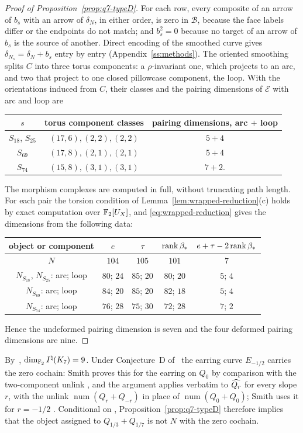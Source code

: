 \begin{proof}[Proof of Proposition~\ref{prop:q7-typeD}]
For each row, every composite of an arrow of $b_s$ with an arrow of $\delta_N$, in either order, is zero
in $\mathcal B$, because the face labels differ or the endpoints do not match; and $b_s^2=0$ because no
target of an arrow of $b_s$ is the source of another.  Direct encoding of the smoothed curve gives
$\delta_{N_s}=\delta_N+b_s$ entry by entry (Appendix~\ref{ss:methods}).
The oriented smoothing splits $C$ into three torus components: a $\rho$-invariant one, which projects to
an arc, and two that project to one closed pillowcase component, the loop.  With the orientations
induced from $C$, their classes and the pairing dimensions of $\mathcal E$ with arc and loop are
\begin{center}
\begin{tabular}{c|c|c}
$s$ & torus component classes & pairing dimensions, arc $+$ loop \\ \hline
$S_{18}$, $S_{25}$ & $(17,6),(2,2),(2,2)$ & $5+4$ \\
$S_{69}$ & $(17,8),(2,1),(2,1)$ & $5+4$ \\
$S_{74}$ & $(15,8),(3,1),(3,1)$ & $7+2$.
\end{tabular}
\end{center}
The morphism complexes are computed in full, without truncating path length.  For each pair the torsion
condition of Lemma~\ref{lem:wrapped-reduction}(c) holds by exact computation over $\mathbb{F}_2[U_X]$, and
\eqref{eq:wrapped-reduction} gives the dimensions from the following data:
\begin{center}
\small
\begin{tabular}{c|c|c|c|c}
object or component & $e$ & $\tau$ & $\operatorname{rank}\beta_*$ & $e+\tau-2\operatorname{rank}\beta_*$ \\ \hline
$N$ & $104$ & $105$ & $101$ & $7$ \\
$N_{S_{18}}$, $N_{S_{25}}$: arc; loop & $80$; $24$ & $85$; $20$ & $80$; $20$ & $5$; $4$ \\
$N_{S_{69}}$: arc; loop & $84$; $20$ & $85$; $20$ & $82$; $18$ & $5$; $4$ \\
$N_{S_{74}}$: arc; loop & $76$; $28$ & $75$; $30$ & $72$; $28$ & $7$; $2$
\end{tabular}
\end{center}
Hence the undeformed pairing dimension is seven and the four deformed pairing dimensions are nine.
\end{proof}

By~\cite[Thm.~1.1]{WuebbenII}, $\dim_{\mathbb{F}_2}I^{\natural}(K_7)=9$.  Under Conjecture~D of~\cite{CHKK} the earring
curve $E_{-1/2}$ carries the zero cochain: Smith proves this for the earring on $Q_0$ by comparison with the
two-component unlink \cite[Lem.~5.3]{Smith}, and the argument applies verbatim to $\widehat{Q_{r}}$ for every
slope $r$, with the unlink $\operatorname{num}(Q_r+Q_{-r})$ in place of
$\operatorname{num}(Q_0+Q_0)$; Smith uses it for $r=-1/2$ \cite[proof of Thm.~5.9]{Smith}.
Conditional on \cite[Conj.~D]{CHKK}, Proposition~\ref{prop:q7-typeD} therefore implies that the object
assigned to $Q_{1/3}+Q_{1/7}$ is not $N$ with the zero cochain.

